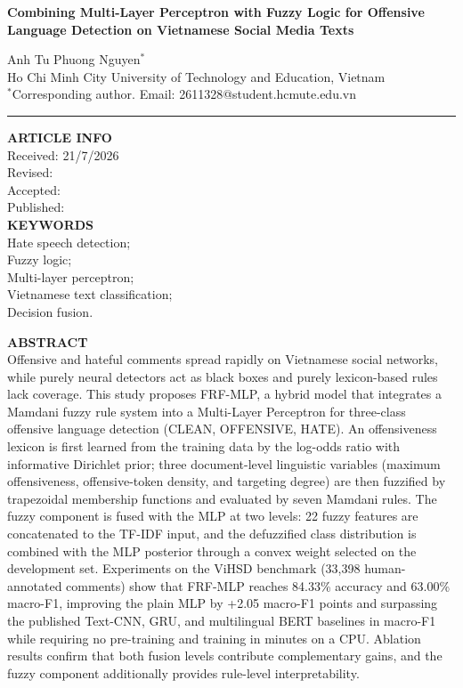 \documentclass[11pt,a4paper]{article}
\begin{document}
\begin{center}
{\fontsize{13}{16}\selectfont\bfseries
Combining Multi-Layer Perceptron with Fuzzy Logic for Offensive Language Detection on Vietnamese Social Media Texts\par}
\vspace{6pt}
Anh Tu Phuong Nguyen$^{*}$\\
Ho Chi Minh City University of Technology and Education, Vietnam\\
$^{*}$Corresponding author. Email: 2611328@student.hcmute.edu.vn
\end{center}

\vspace{4pt}
\noindent\rule{\textwidth}{0.6pt}
\noindent
\begin{minipage}[t]{0.28\textwidth}
\vspace{2pt}
{\fontsize{10}{12}\selectfont
\textbf{ARTICLE INFO}\\[3pt]
Received: 21/7/2026\\
Revised:\\
Accepted:\\
Published:\\[6pt]
\textbf{KEYWORDS}\\[3pt]
Hate speech detection;\\
Fuzzy logic;\\
Multi-layer perceptron;\\
Vietnamese text classification;\\
Decision fusion.
}
\end{minipage}\hfill
\begin{minipage}[t]{0.68\textwidth}
\vspace{2pt}
{\fontsize{10}{12}\selectfont
\textbf{ABSTRACT}\\[3pt]
Offensive and hateful comments spread rapidly on Vietnamese social networks, while purely neural detectors act as black boxes and purely lexicon-based rules lack coverage. This study proposes FRF-MLP, a hybrid model that integrates a Mamdani fuzzy rule system into a Multi-Layer Perceptron for three-class offensive language detection (CLEAN, OFFENSIVE, HATE). An offensiveness lexicon is first learned from the training data by the log-odds ratio with informative Dirichlet prior; three document-level linguistic variables (maximum offensiveness, offensive-token density, and targeting degree) are then fuzzified by trapezoidal membership functions and evaluated by seven Mamdani rules. The fuzzy component is fused with the MLP at two levels: 22 fuzzy features are concatenated to the TF-IDF input, and the defuzzified class distribution is combined with the MLP posterior through a convex weight selected on the development set. Experiments on the ViHSD benchmark (33,398 human-annotated comments) show that FRF-MLP reaches 84.33\% accuracy and 63.00\% macro-F1, improving the plain MLP by +2.05 macro-F1 points and surpassing the published Text-CNN, GRU, and multilingual BERT baselines in macro-F1 while requiring no pre-training and training in minutes on a CPU. Ablation results confirm that both fusion levels contribute complementary gains, and the fuzzy component additionally provides rule-level interpretability.
}
\end{minipage}
\end{document}
